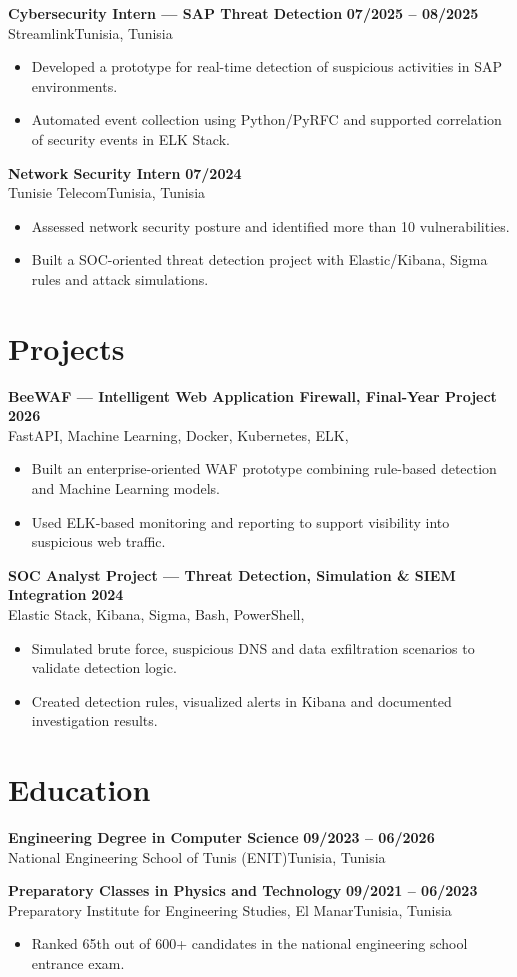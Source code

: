\documentclass[a4paper,10pt]{article}
\newcommand{\cventry}[4]{%
  \textbf{#1} \hfill \textbf{#4}\\[1pt]
  #2{\ifx\relax#3\relax\else, #3\fi}\par\vspace{2pt}}
\begin{document}
\cventry{Cybersecurity Intern — SAP Threat Detection}{Streamlink}{Tunisia}{07/2025 -- 08/2025}
\begin{itemize}
  \item Developed a prototype for real-time detection of suspicious activities in SAP environments.
  \item Automated event collection using Python/PyRFC and supported correlation of security events in ELK Stack.
\end{itemize}

\cventry{Network Security Intern}{Tunisie Telecom}{Tunisia}{07/2024}
\begin{itemize}
  \item Assessed network security posture and identified more than 10 vulnerabilities.
  \item Built a SOC-oriented threat detection project with Elastic/Kibana, Sigma rules and attack simulations.
\end{itemize}

\section{Projects}
\cventry{BeeWAF — Intelligent Web Application Firewall, Final-Year Project}{FastAPI, Machine Learning, Docker, Kubernetes, ELK}{}{2026}
\begin{itemize}
  \item Built an enterprise-oriented WAF prototype combining rule-based detection and Machine Learning models.
  \item Used ELK-based monitoring and reporting to support visibility into suspicious web traffic.
\end{itemize}

\cventry{SOC Analyst Project — Threat Detection, Simulation \& SIEM Integration}{Elastic Stack, Kibana, Sigma, Bash, PowerShell}{}{2024}
\begin{itemize}
  \item Simulated brute force, suspicious DNS and data exfiltration scenarios to validate detection logic.
  \item Created detection rules, visualized alerts in Kibana and documented investigation results.
\end{itemize}

\section{Education}
\cventry{Engineering Degree in Computer Science}{National Engineering School of Tunis (ENIT)}{Tunisia}{09/2023 -- 06/2026}
\cventry{Preparatory Classes in Physics and Technology}{Preparatory Institute for Engineering Studies, El Manar}{Tunisia}{09/2021 -- 06/2023}
\begin{itemize}
  \item Ranked 65th out of 600+ candidates in the national engineering school entrance exam.
\end{itemize}
\end{document}

